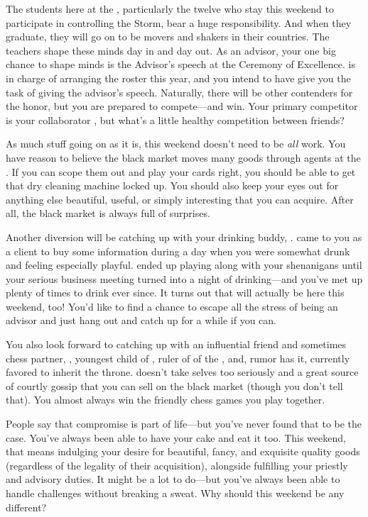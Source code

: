 \documentclass[char]{GL2020}
\begin{document}
The students here at the \pSc{}, particularly the twelve who stay this weekend to participate in controlling the Storm, bear a huge responsibility. And when they graduate, they will go on to be movers and shakers in their countries. The teachers shape these minds day in and day out. As an advisor, your one big chance to shape minds is the Advisor's speech at the Ceremony of Excellence. \cMusic{} is in charge of arranging the roster this year, and you intend to have \cMusic{\them} give you the task of giving the advisor's speech. Naturally, there will be other contenders for the honor, but you are prepared to compete---and win. Your primary competitor is your collaborator \cCurse{}, but what's a little healthy competition between friends?

As much stuff going on as it is, this weekend doesn't need to be \emph{all} work. You have reason to believe the black market moves many goods through agents at the \pSc{}. If you can scope them out and play your cards right, you should be able to get that dry cleaning machine locked up. You should also keep your eyes out for anything else beautiful, useful, or simply interesting that you can acquire. After all, the black market is always full of surprises.

Another diversion will be catching up with your drinking buddy, \cWildCard{\full}. \cWildCard{} came to you as a client to buy some information during a day when you were somewhat drunk and feeling especially playful. \cWildCard{} ended up playing along with your shenanigans until your serious business meeting turned into a night of drinking---and you've met up plenty of times to drink ever since. It turns out that \cWildCard{} will actually be here this weekend, too! You'd like to find a chance to escape all the stress of being an advisor and just hang out and catch up for a while if you can. 

You also look forward to catching up with an influential friend and sometimes chess partner, \cPrince{\full}, youngest child of \cQueen{\full}, ruler of of the \pFarm{}, and, rumor has it, currently favored to inherit the throne. \cPrince{} doesn't take \cPrince{\them}selves too seriously and \cPrince{\are} a great source of courtly gossip that you can sell on the black market (though you don't tell \cPrince{\them} that). You almost always win the friendly chess games you play together.

People say that compromise is part of life---but you've never found that to be the case. You've always been able to have your cake and eat it too. This weekend, that means indulging your desire for beautiful, fancy, and exquisite quality goods (regardless of the legality of their acquisition), alongside fulfilling your priestly and advisory duties. It might be a lot to do---but you've always been able to handle challenges without breaking a sweat. Why should this weekend be any different?
\end{document}
